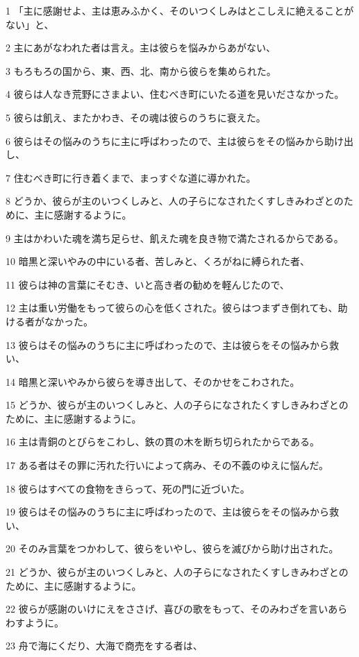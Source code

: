 \par 1 「主に感謝せよ、主は恵みふかく、そのいつくしみはとこしえに絶えることがない」と、
\par 2 主にあがなわれた者は言え。主は彼らを悩みからあがない、
\par 3 もろもろの国から、東、西、北、南から彼らを集められた。
\par 4 彼らは人なき荒野にさまよい、住むべき町にいたる道を見いださなかった。
\par 5 彼らは飢え、またかわき、その魂は彼らのうちに衰えた。
\par 6 彼らはその悩みのうちに主に呼ばわったので、主は彼らをその悩みから助け出し、
\par 7 住むべき町に行き着くまで、まっすぐな道に導かれた。
\par 8 どうか、彼らが主のいつくしみと、人の子らになされたくすしきみわざとのために、主に感謝するように。
\par 9 主はかわいた魂を満ち足らせ、飢えた魂を良き物で満たされるからである。
\par 10 暗黒と深いやみの中にいる者、苦しみと、くろがねに縛られた者、
\par 11 彼らは神の言葉にそむき、いと高き者の勧めを軽んじたので、
\par 12 主は重い労働をもって彼らの心を低くされた。彼らはつまずき倒れても、助ける者がなかった。
\par 13 彼らはその悩みのうちに主に呼ばわったので、主は彼らをその悩みから救い、
\par 14 暗黒と深いやみから彼らを導き出して、そのかせをこわされた。
\par 15 どうか、彼らが主のいつくしみと、人の子らになされたくすしきみわざとのために、主に感謝するように。
\par 16 主は青銅のとびらをこわし、鉄の貫の木を断ち切られたからである。
\par 17 ある者はその罪に汚れた行いによって病み、その不義のゆえに悩んだ。
\par 18 彼らはすべての食物をきらって、死の門に近づいた。
\par 19 彼らはその悩みのうちに主に呼ばわったので、主は彼らをその悩みから救い、
\par 20 そのみ言葉をつかわして、彼らをいやし、彼らを滅びから助け出された。
\par 21 どうか、彼らが主のいつくしみと、人の子らになされたくすしきみわざとのために、主に感謝するように。
\par 22 彼らが感謝のいけにえをささげ、喜びの歌をもって、そのみわざを言いあらわすように。
\par 23 舟で海にくだり、大海で商売をする者は、
